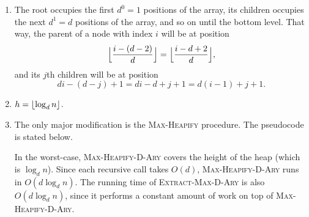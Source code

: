 \begin{enumerate}
\begin{framed}
\begin{enumerate}
\item The root occupies the first $d^0 = 1$ positions of the array, its
children occupies the next $d^1 = d$ positions of the array, and so on until
the bottom level. That way, the parent of a node with index $i$ will be at
position
\[
  \Bigl\lfloor{\frac{i - (d - 2)}{d}}\Bigr\rfloor
  = \Bigl\lfloor{\frac{i - d + 2}{d}}\Bigr\rfloor,
\]
and its $j$th children will be at position
\[
  di - (d - j) + 1 = di - d + j + 1 = d (i - 1) + j + 1.
\]

\item $h = \lfloor\log_d n\rfloor$.

\item The only major modification is the \textsc{Max-Heapify} procedure. The
pseudocode is stated below.

\begin{algorithm}[H]
\SetAlgoNoEnd\DontPrintSemicolon
\BlankLine
{}
\end{algorithm}

\begin{algorithm}[H]
\SetAlgoNoEnd\DontPrintSemicolon
\BlankLine
{}
\end{algorithm}

\begin{algorithm}[H]
\SetAlgoNoEnd\DontPrintSemicolon
\BlankLine
{}
\end{algorithm}

In the worst-case, \textsc{Max-Heapify-D-Ary} covers the height of the heap
(which is $\log_d n$).  Since each recursive call takes $O(d)$,
\textsc{Max-Heapify-D-Ary} runs in $O(d \log_d n)$. The running time of
\textsc{Extract-Max-D-Ary} is also $O(d \log_d n)$, since it performs a constant
amount of work on top of \textsc{Max-Heapify-D-Ary}.


\end{enumerate}
\end{framed}
\end{enumerate}
